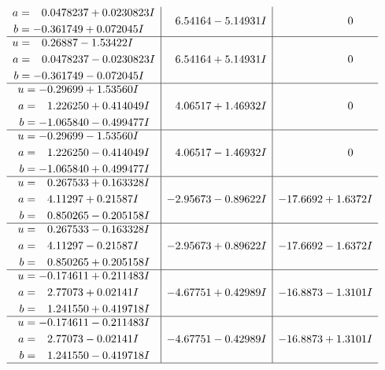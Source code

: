 \documentclass[1p]{elsarticle_modified}
\theoremstyle{definition}
\begin{document}
$$\begin{array}{c|c|c}
\begin{aligned}
a &= \phantom{-}0.0478237 + 0.0230823 I \\
b &= -0.361749 + 0.072045 I\end{aligned}
 & \phantom{-}6.54164 - 5.14931 I & \phantom{-0.000000 } 0 \\ \hline\begin{aligned}
u &= \phantom{-}0.26887 - 1.53422 I \\
a &= \phantom{-}0.0478237 - 0.0230823 I \\
b &= -0.361749 - 0.072045 I\end{aligned}
 & \phantom{-}6.54164 + 5.14931 I & \phantom{-0.000000 } 0 \\ \hline\begin{aligned}
u &= -0.29699 + 1.53560 I \\
a &= \phantom{-}1.226250 + 0.414049 I \\
b &= -1.065840 - 0.499477 I\end{aligned}
 & \phantom{-}4.06517 + 1.46932 I & \phantom{-0.000000 } 0 \\ \hline\begin{aligned}
u &= -0.29699 - 1.53560 I \\
a &= \phantom{-}1.226250 - 0.414049 I \\
b &= -1.065840 + 0.499477 I\end{aligned}
 & \phantom{-}4.06517 - 1.46932 I & \phantom{-0.000000 } 0 \\ \hline\begin{aligned}
u &= \phantom{-}0.267533 + 0.163328 I \\
a &= \phantom{-}4.11297 + 0.21587 I \\
b &= \phantom{-}0.850265 - 0.205158 I\end{aligned}
 & -2.95673 - 0.89622 I & -17.6692 + 1.6372 I \\ \hline\begin{aligned}
u &= \phantom{-}0.267533 - 0.163328 I \\
a &= \phantom{-}4.11297 - 0.21587 I \\
b &= \phantom{-}0.850265 + 0.205158 I\end{aligned}
 & -2.95673 + 0.89622 I & -17.6692 - 1.6372 I \\ \hline\begin{aligned}
u &= -0.174611 + 0.211483 I \\
a &= \phantom{-}2.77073 + 0.02141 I \\
b &= \phantom{-}1.241550 + 0.419718 I\end{aligned}
 & -4.67751 + 0.42989 I & -16.8873 - 1.3101 I \\ \hline\begin{aligned}
u &= -0.174611 - 0.211483 I \\
a &= \phantom{-}2.77073 - 0.02141 I \\
b &= \phantom{-}1.241550 - 0.419718 I\end{aligned}
 & -4.67751 - 0.42989 I & -16.8873 + 1.3101 I\\
 \hline 
 \end{array}$$\newpage
\end{document}
